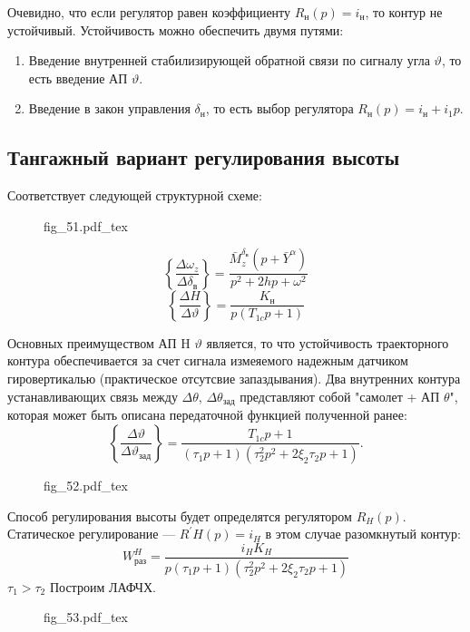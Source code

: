 \documentclass{article}
\newcommand{\incfig}[1]{
    {#1.pdf_tex}
}
\begin{document}
Очевидно, что если регулятор равен коэффициенту $R_\text{н}(p)  = i_\text{н}$, то контур не устойчивый.
Устойчивость можно обеспечить двумя путями:

\begin{enumerate}
	\item Введение внутренней стабилизирующей обратной связи по сигналу угла $\vartheta$, то есть введение АП $\vartheta$.
	\item Введение в закон управления $\delta_\text{н}$, то есть выбор регулятора $R_\text{н}(p) = i_\text{н} + i_1p$.
\end{enumerate}

\subsection{Тангажный вариант регулирования высоты}
Соответствует следующей структурной схеме:

\begin{figure}[H]
	\centering
	\incfig{fig_51}
	\label{fig:fig_51}
\end{figure}

\[
	\left\{\frac{\Delta \omega_z}{\Delta \delta_\text{в}} \right\} = \frac{\bar{M}_z^{\delta_\text{в}}(p + \bar{Y}^\alpha)}{p^2 + 2hp + \omega^2} 
\]
\[
	\left\{ \frac{\Delta H}{\Delta \vartheta} \right\} = \frac{K_\text{н}}{p(T_{1c}p +1)}
\]

Основных преимуществом АП H $\vartheta$ является, то что устойчивость траекторного контура обеспечивается за счет сигнала измеяемого надежным датчиком гировертикалью (практическое отсутсвие запаздывания). Два внутренних контура устанавливающих связь между $\Delta \theta$, $\Delta \theta_\text{зад}$ представляют собой "самолет + АП $\theta$", которая может быть описана передаточной функцией полученной ранее:
\[
	\left\{\frac{\Delta \vartheta}{\Delta \vartheta_\text{зад}} \right\} =\frac{T_{1c}p + 1}{(\tau_1 p + 1) (\tau_2^2p^2 + 2 \xi_2 \tau_2 p + 1)}.
\]
\begin{figure}[H]
	\centering
	\incfig{fig_52}
	\label{fig:fig_52}
\end{figure}
Способ регулирования высоты будет определятся регулятором $R_H(p)$.
Статическое регулирование --- $R^{'}H(p) = i_H$ в этом случае разомкнутый контур:
\[
	W_\text{раз}^H =\frac{i_H K_H}{p(\tau_1 p + 1)(\tau_2^2 p^2 + 2 \xi_2 \tau_2 p + 1)}
\]
$\tau_1 > \tau_2$
Построим ЛАФЧХ. 

\begin{figure}[H]
	\centering
	\incfig{fig_53}
	\label{fig:fig_53}
\end{figure}
\end{document}
